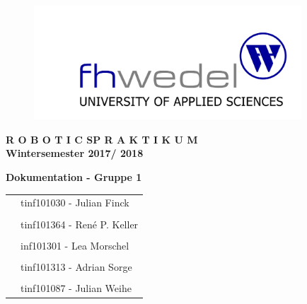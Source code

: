 \documentclass[12pt, a4paper]{scrartcl}
\begin{document}

\begin{center}
	
	\begin{figure}[H]
		\centering
		\includegraphics[width=10cm]{Bilder/fh-wedel-logo.png}
	\end{figure}
	
	\vspace*{1cm}
	
	
		\vspace*{0.5cm}
	
	\Large{\textbf{ R O B O T I C S\quad P R A K T I K U M \\ Wintersemester 2017/ 2018\\}}
	
	\vspace*{1.5cm}
	
	\huge{\textbf{Dokumentation - Gruppe 1\\}}
	
	\vspace*{1.5cm}
	
	\vfill
	\begin{table}[h]\centering
		\begin{tabular}{l l}
			 &  tinf101030 - Julian Finck \\
			 & \\
			 & tinf101364 - René P. Keller  \\
			 & \\
			 & inf101301 - Lea Morschel \\
			 & \\
			 & tinf101313 - Adrian Sorge \\
			 & \\
			 & tinf101087 - Julian Weihe \\
		\end{tabular}
	\end{table}
\end{center}
\end{document}
